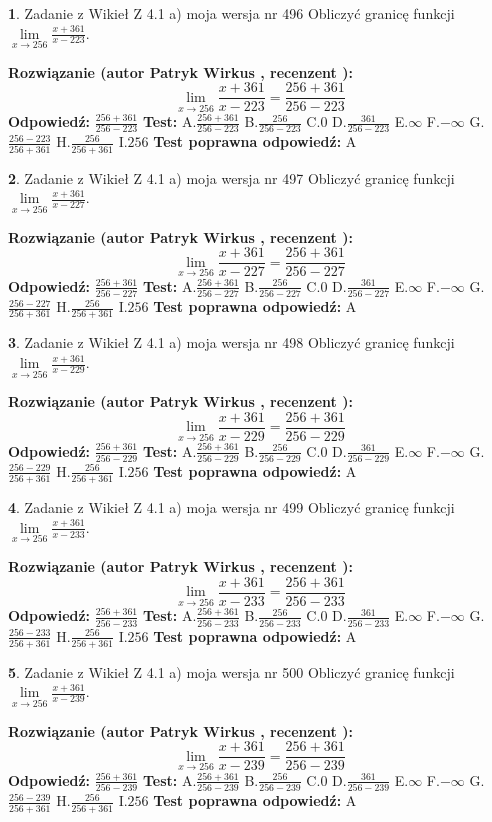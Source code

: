\documentclass[12pt, a4paper]{article}
\theoremstyle{definition} %
\newtheorem{zad}{}
\newcommand{\zadStart}[1]{\begin{zad}#1\newline}
\newcommand{\zadStop}{\end{zad}}
\newcommand{\rozwStart}[2]{\noindent \textbf{Rozwiązanie (autor #1 , recenzent #2): }\newline}
\newcommand{\rozwStop}{\newline}
\newcommand{\odpStart}{\noindent \textbf{Odpowiedź:}\newline}
\newcommand{\odpStop}{\newline}
\newcommand{\testStart}{\noindent \textbf{Test:}\newline}
\newcommand{\testStop}{\newline}
\newcommand{\kluczStart}{\noindent \textbf{Test poprawna odpowiedź:}\newline}
\newcommand{\kluczStop}{\newline}
\begin{document}
\zadStart{Zadanie z Wikieł Z 4.1 a) moja wersja nr 496}
Obliczyć granicę funkcji $\lim\limits_{x\to256}\frac{x+361}{x-223}$.
\zadStop
\rozwStart{Patryk Wirkus}{}
$$\lim\limits_{x\to256}\frac{x+361}{x-223} = \frac{256+361}{256-223}$$
\rozwStop
\odpStart
$\frac{256+361}{256-223}$
\odpStop
\testStart
A.$\frac{256+361}{256-223}$
B.$\frac{256}{256-223}$
C.$0$
D.$\frac{361}{256-223}$
E.$\infty$
F.$-\infty$
G.$\frac{256-223}{256+361}$
H.$\frac{256}{256+361}$
I.$256$
\testStop
\kluczStart
A
\kluczStop



\zadStart{Zadanie z Wikieł Z 4.1 a) moja wersja nr 497}
Obliczyć granicę funkcji $\lim\limits_{x\to256}\frac{x+361}{x-227}$.
\zadStop
\rozwStart{Patryk Wirkus}{}
$$\lim\limits_{x\to256}\frac{x+361}{x-227} = \frac{256+361}{256-227}$$
\rozwStop
\odpStart
$\frac{256+361}{256-227}$
\odpStop
\testStart
A.$\frac{256+361}{256-227}$
B.$\frac{256}{256-227}$
C.$0$
D.$\frac{361}{256-227}$
E.$\infty$
F.$-\infty$
G.$\frac{256-227}{256+361}$
H.$\frac{256}{256+361}$
I.$256$
\testStop
\kluczStart
A
\kluczStop



\zadStart{Zadanie z Wikieł Z 4.1 a) moja wersja nr 498}
Obliczyć granicę funkcji $\lim\limits_{x\to256}\frac{x+361}{x-229}$.
\zadStop
\rozwStart{Patryk Wirkus}{}
$$\lim\limits_{x\to256}\frac{x+361}{x-229} = \frac{256+361}{256-229}$$
\rozwStop
\odpStart
$\frac{256+361}{256-229}$
\odpStop
\testStart
A.$\frac{256+361}{256-229}$
B.$\frac{256}{256-229}$
C.$0$
D.$\frac{361}{256-229}$
E.$\infty$
F.$-\infty$
G.$\frac{256-229}{256+361}$
H.$\frac{256}{256+361}$
I.$256$
\testStop
\kluczStart
A
\kluczStop



\zadStart{Zadanie z Wikieł Z 4.1 a) moja wersja nr 499}
Obliczyć granicę funkcji $\lim\limits_{x\to256}\frac{x+361}{x-233}$.
\zadStop
\rozwStart{Patryk Wirkus}{}
$$\lim\limits_{x\to256}\frac{x+361}{x-233} = \frac{256+361}{256-233}$$
\rozwStop
\odpStart
$\frac{256+361}{256-233}$
\odpStop
\testStart
A.$\frac{256+361}{256-233}$
B.$\frac{256}{256-233}$
C.$0$
D.$\frac{361}{256-233}$
E.$\infty$
F.$-\infty$
G.$\frac{256-233}{256+361}$
H.$\frac{256}{256+361}$
I.$256$
\testStop
\kluczStart
A
\kluczStop



\zadStart{Zadanie z Wikieł Z 4.1 a) moja wersja nr 500}
Obliczyć granicę funkcji $\lim\limits_{x\to256}\frac{x+361}{x-239}$.
\zadStop
\rozwStart{Patryk Wirkus}{}
$$\lim\limits_{x\to256}\frac{x+361}{x-239} = \frac{256+361}{256-239}$$
\rozwStop
\odpStart
$\frac{256+361}{256-239}$
\odpStop
\testStart
A.$\frac{256+361}{256-239}$
B.$\frac{256}{256-239}$
C.$0$
D.$\frac{361}{256-239}$
E.$\infty$
F.$-\infty$
G.$\frac{256-239}{256+361}$
H.$\frac{256}{256+361}$
I.$256$
\testStop
\kluczStart
A
\kluczStop
\end{document}
